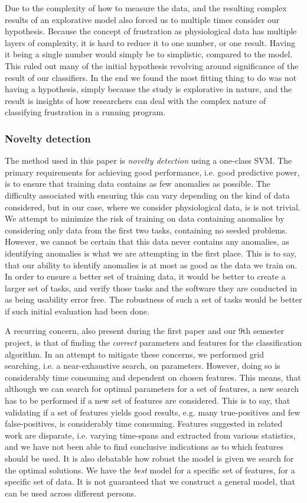 Due to the complexity of how to measure the data, and the resulting complex results of an explorative model also forced
us to multiple times consider our hypothesis. Because the concept of frustration as physiological data has multiple
layers of complexity, it is hard to reduce it to one number, or one result. Having it being a single number would simply
be to simplistic, compared to the model. This ruled out many of the initial hypothesis revolving around significance of the result of our classifiers. In the end we found the most fitting thing to do was not having a hypothesis, simply because the study is explorative in nature, and the result is insights of how researchers can deal with the complex nature of classifying frustration in a running program.

\subsubsection{Novelty detection}
The method used in this paper is \textit{novelty detection} using a one-class SVM. The primary requirements for
achieving good performance, i.e. good predictive power, is to ensure that training data contains as few anomalies as
possible. The difficulty associated with ensuring this can vary depending on the kind of data considered, but in our
case, where we consider physiological data, is is not trivial. We attempt to minimize the risk of
training on data containing anomalies by considering only data from the first two tasks, containing no seeded
problems. However, we cannot be certain that this data never contains any anomalies, as identifying anomalies is what we
are attempting in the first place. This is to say, that our ability to identify anomalies is at most as good as the data
we train on. In order to ensure a better set of training data, it would be better to create a larger set of tasks, and verify those tasks and the software they are conducted in as being usability error free. 
The robustness of such a set of tasks would be better if such initial evaluation had been done.

A recurring concern, also present during the first paper and our 9th semester project, is that of finding the
\textit{correct} parameters and features for the classification algorithm. In an attempt to mitigate these concerns, we
performed grid searching, i.e. a near-exhaustive search, on parameters. However, doing so is considerably time consuming
and dependent on chosen features. This means, that although we can search for optimal parameters for a set of features,
a new search has to be performed if a new set of features are considered. This is to say, that validating if a set of
features yields good results, e.g. many true-positives and few false-positives, is considerably time consuming. Features
suggested in related work are disparate, i.e. varying time-spans and extracted from various statistics, and we have not
been able to find conclusive indications as to which features should be used. 
It is also debatable how robust the model is given we search for the optimal solutions. 
We have the \textit{best} model for a specific set of features, for a specific set of data. 
It is not guaranteed that we construct a general model, that can be used across different persons. 